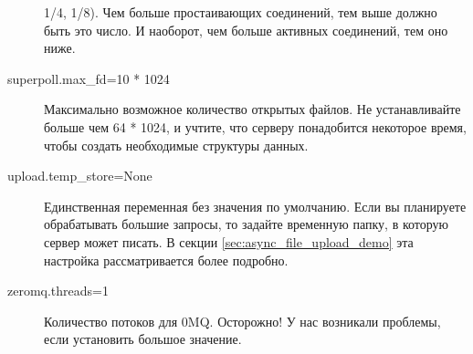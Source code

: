 \begin{description}
1/4, 1/8). Чем больше простаивающих соединений, тем выше должно быть
это число. И наоборот, чем больше активных соединений, тем оно ниже.
\item[superpoll.max\_fd=10 * 1024] Максимально возможное количество
открытых файлов. Не устанавливайте больше чем 64 * 1024, и учтите, что
серверу понадобится некоторое время, чтобы создать необходимые
структуры данных.
\item[upload.temp\_store=None] Единственная переменная без значения по
умолчанию. Если вы планируете обрабатывать большие запросы, то задайте
временную папку, в которую сервер может писать. В секции
\ref{sec:async_file_upload_demo} эта настройка рассматривается более подробно.
\item[zeromq.threads=1] Количество потоков для 0MQ. Осторожно! У нас
возникали проблемы, если установить большое значение.
\end{description}
